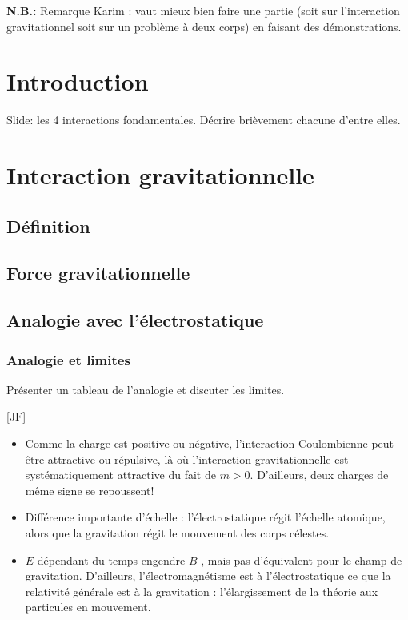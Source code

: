 \documentclass[11pt]{report}
\numberwithin{figure}{section}
\numberwithin{equation}{section}
\numberwithin{table}{section}
\newcommand{\1}{\boldsymbol{1}}
\begin{document}
  
\textcolor{mycolor4}{\textbf{N.B.:} Remarque Karim : vaut mieux bien faire une partie (soit sur l'interaction gravitationnel soit sur un problème à deux corps) en faisant des démonstrations.}


\section*{Introduction}

Slide: les 4 interactions fondamentales. Décrire brièvement chacune d'entre elles.

\section{Interaction gravitationnelle}


\subsection{Définition}

\subsection{Force gravitationnelle}

\subsection{Analogie avec l'électrostatique}

\subsubsection{Analogie et limites}

Présenter un tableau de l'analogie et discuter les limites.

[JF]
\begin{itemize}
\item Comme la charge est positive ou négative, l'interaction Coulombienne peut être attractive ou répulsive, là où l'interaction gravitationnelle est systématiquement attractive du fait de $m > 0$. D'ailleurs, deux charges de même signe se repoussent!
\item Différence importante d'échelle : l'électrostatique régit l'échelle atomique, alors que la gravitation régit le
mouvement des corps célestes.
\item $E$ dépendant du temps engendre $B$ , mais pas d'équivalent pour le champ de gravitation. D'ailleurs, l'électromagnétisme est à l'électrostatique ce que la relativité générale est à la gravitation : l'élargissement de la théorie aux particules en mouvement.
\end{itemize}
\end{document}
